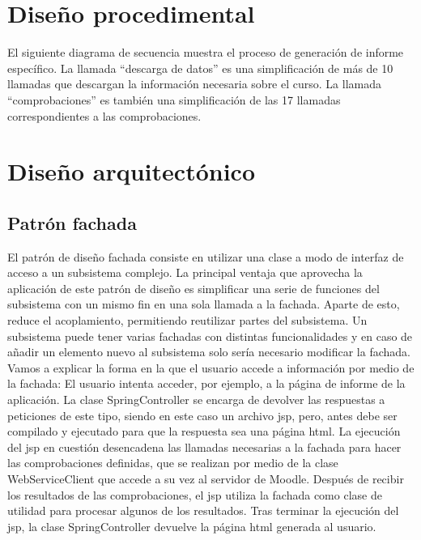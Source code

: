 \section{Diseño procedimental}
El siguiente diagrama de secuencia muestra el proceso de generación de informe específico. La llamada ``descarga de datos'' es una simplificación de más de 10 llamadas que descargan la información necesaria sobre el curso. La llamada ``comprobaciones'' es también una simplificación de las 17 llamadas correspondientes a las comprobaciones.
\section{Diseño arquitectónico}
\subsection{Patrón fachada}
El patrón de diseño fachada consiste en utilizar una clase a modo de interfaz de acceso a un subsistema complejo. La principal ventaja que aprovecha la aplicación de este patrón de diseño es simplificar una serie de funciones del subsistema con un mismo fin en una sola llamada a la fachada. Aparte de esto, reduce el acoplamiento, permitiendo reutilizar partes del subsistema. Un subsistema puede tener varias fachadas con distintas funcionalidades y en caso de añadir un elemento nuevo al subsistema solo sería necesario modificar la fachada.
Vamos a explicar la forma en la que el usuario accede a información por medio de la fachada:
El usuario intenta acceder, por ejemplo, a la página de informe de la aplicación. La clase SpringController se encarga de devolver las respuestas a peticiones de este tipo, siendo en este caso un archivo jsp, pero, antes debe ser compilado y ejecutado para que la respuesta sea una página html. La ejecución del jsp en cuestión desencadena las llamadas necesarias a la fachada para hacer las comprobaciones definidas, que se realizan por medio de la clase WebServiceClient que accede a su vez al servidor de Moodle. Después de recibir los resultados de las comprobaciones, el jsp utiliza la fachada como clase de utilidad para procesar algunos de los resultados. Tras terminar la ejecución del jsp, la clase SpringController devuelve la página html generada al usuario.